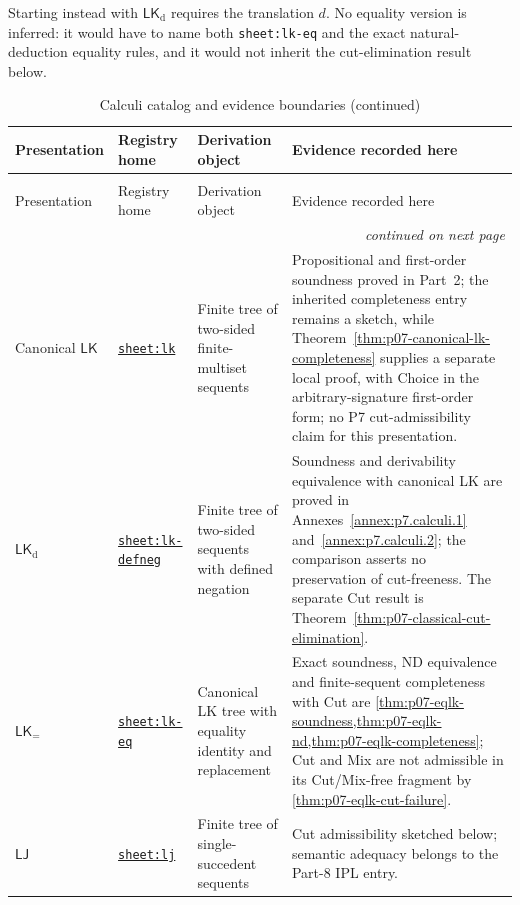 Starting instead with \(\mathsf{LK}_{\mathrm d}\) requires the translation
\(d\).  No equality version is inferred: it would have to name both
\texttt{sheet:lk-eq} and the exact natural-deduction equality rules, and it
would not inherit the cut-elimination result below.

\begingroup\scriptsize
\begin{longtable}{@{}p{}p{}p{}
  p{}@{}}
\caption{Calculi catalog and evidence boundaries.}
\label{tab:p07-calculi-catalog}\\
\toprule
Presentation & Registry home & Derivation object & Evidence recorded here \\
\midrule
\endfirsthead
\caption[]{Calculi catalog and evidence boundaries (continued)}\\
\toprule
Presentation & Registry home & Derivation object & Evidence recorded here \\
\midrule
\endhead
\midrule\multicolumn{4}{r}{\emph{continued on next page}}\\
\endfoot
\endlastfoot
Canonical \(\mathsf{LK}\) & \hyperref[sheet:lk]{\texttt{sheet:lk}} & Finite
tree of two-sided finite-multiset sequents & Propositional and first-order
soundness proved in Part~2; the inherited completeness entry remains a sketch,
while Theorem~\ref{thm:p07-canonical-lk-completeness} supplies a separate local
proof, with Choice in the arbitrary-signature first-order form; no P7
cut-admissibility claim for this presentation. \\
\(\mathsf{LK}_{\mathrm d}\) &
\hyperref[sheet:lk-defneg]{\texttt{sheet:lk-defneg}} & Finite tree of
two-sided sequents with defined negation & Soundness and derivability equivalence with canonical LK are proved in
Annexes~\ref{annex:p7.calculi.1} and~\ref{annex:p7.calculi.2}; the
comparison asserts no preservation of cut-freeness. The separate Cut
result is Theorem~\ref{thm:p07-classical-cut-elimination}. \\
\(\mathsf{LK}_{=}\) & \hyperref[sheet:lk-eq]{\texttt{sheet:lk-eq}} &
Canonical LK tree with equality identity and replacement & Exact soundness,
ND equivalence and finite-sequent completeness with Cut are
\cref{thm:p07-eqlk-soundness,thm:p07-eqlk-nd,thm:p07-eqlk-completeness};
Cut and Mix are not admissible in its Cut/Mix-free fragment by
\cref{thm:p07-eqlk-cut-failure}. \\
\(\mathsf{LJ}\) & \hyperref[sheet:lj]{\texttt{sheet:lj}} & Finite tree of
single-succedent sequents & Cut admissibility sketched below; semantic
adequacy belongs to the Part-8 IPL entry. \\

\end{longtable}
